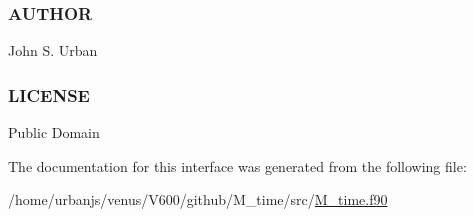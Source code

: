  \subsubsection*{A\+U\+T\+H\+OR}

John S. Urban \subsubsection*{L\+I\+C\+E\+N\+SE}

Public Domain 

The documentation for this interface was generated from the following file\+:\begin{DoxyCompactItemize}
\item 
/home/urbanjs/venus/\+V600/github/\+M\+\_\+time/src/\mbox{\hyperlink{M__time_8f90}{M\+\_\+time.\+f90}}\end{DoxyCompactItemize}

